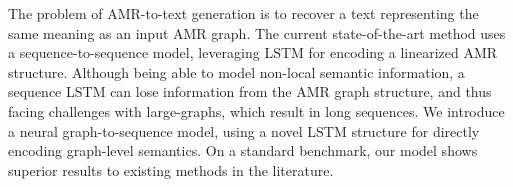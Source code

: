 The problem of AMR-to-text generation is to recover a text representing the same meaning as an input AMR graph. The current state-of-the-art method uses a sequence-to-sequence model, leveraging LSTM for encoding a linearized AMR structure. Although being able to model non-local semantic information, a sequence LSTM can lose information from the AMR graph structure, and thus facing challenges with large-graphs, which result in long sequences. We introduce a neural graph-to-sequence model, using a novel LSTM structure for directly encoding graph-level semantics. On a standard benchmark, our model shows superior results to existing methods in the literature.
